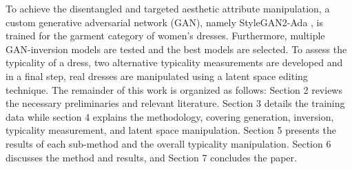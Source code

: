 To achieve the disentangled and targeted aesthetic attribute manipulation, a custom generative adversarial network (GAN), namely StyleGAN2-Ada \citep{stylegan2ada}, is trained for the garment category of women's dresses. Furthermore, multiple GAN-inversion models are tested and the best models are selected. To assess the typicality of a dress, two alternative typicality measurements are developed and in a final step, real dresses are manipulated using a latent space editing technique. The remainder of this work is organized as follows: Section 2 reviews the necessary preliminaries and relevant literature. Section 3 details the training data while section 4 explains the methodology, covering generation, inversion, typicality measurement, and latent space manipulation. Section 5 presents the results of each sub-method and the overall typicality manipulation. Section 6 discusses the method and results, and Section 7 concludes the paper.






 

